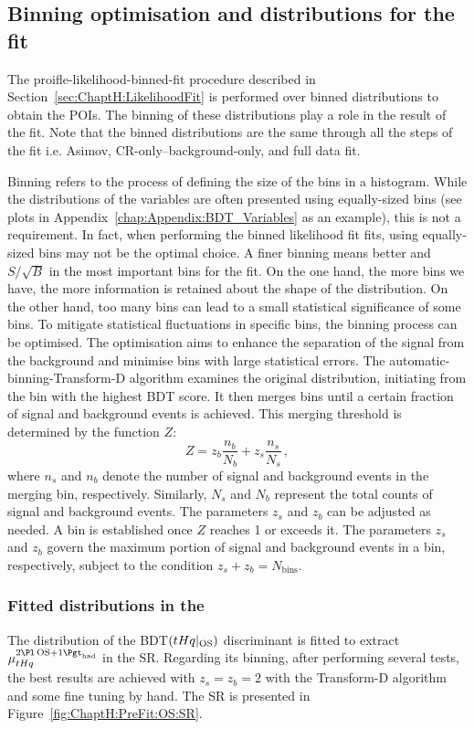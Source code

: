 \subsection{Binning optimisation and distributions for the fit}
\label{sec:ChaptH:Fit:binning}
The proifle-likelihood-binned-fit procedure described in Section~\ref{sec:ChaptH:LikelihoodFit} is performed over 
binned distributions to obtain the POIs. The binning of these distributions play a role in the result 
of the fit. Note that the binned distributions are the same through all the steps of the fit i.e. Asimov, 
CR-only--background-only, and full data fit.

Binning refers to the process of defining the size of the bins in a histogram. 
While the distributions of the variables are often presented using equally-sized bins 
(see plots in Appendix~\ref{chap:Appendix:BDT_Variables} as an example), this is not a requirement. 
In fact, when performing the binned likelihood fit fits, using equally-sized bins may not be the optimal choice. 
A finer binning means better \StoB and $S/\sqrt{B}$ in the most important bins for the fit.
On the one hand, the more bins we have, the more information is retained about the shape of the distribution.
On the other hand, too many bins can lead to a small statistical significance of some bins.
To mitigate statistical fluctuations in specific bins, the binning process can be optimised. 
The optimisation aims to enhance the separation of the \tHq signal from the background 
and minimise bins with large statistical errors. The automatic-binning-Transform-D algorithm examines the 
original distribution, initiating from the bin with the highest BDT score. 
It then merges bins until a certain fraction of signal and background events is achieved. 
This merging threshold is determined by the function $Z$:
\begin{equation*}
	Z = z_{b}\frac{n_b}{N_b} + z_{s}\frac{n_s}{N_s}\, ,
\end{equation*}
where \( n_s \) and \( n_b \) denote the number of signal and background events 
in the merging bin, respectively. Similarly, \( N_s \) and \( N_b \) represent the total 
counts of signal and background events. The parameters \( z_s \) and \( z_b \) 
can be adjusted as needed. A bin is established once \( Z \) reaches 1 or exceeds 
it. The parameters \( z_s \) and \( z_b \) govern the maximum portion of signal and 
background events in a bin, respectively, subject to the condition 
\( z_s + z_b = N_{\text{bins}} \).

\subsubsection{Fitted distributions in the \dilepOStau}
\label{sec:ChaptH:Fit:Distributions:OS}
The distribution of the BDT$(tHq|_{\text{OS}})$ discriminant is fitted to extract $\mu_{\tHq}^{\dilepOStau}$ in the SR.
Regarding its binning, after performing several tests, the best results are achieved with $z_{s} = z_{b} = 2$
with the Transform-D algorithm and some fine tuning by hand. The SR is presented in Figure~\ref{fig:ChaptH:PreFit:OS:SR}.

